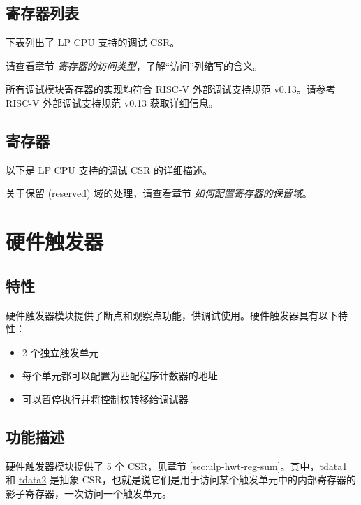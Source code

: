 \documentclass[main\_\_CN.tex]{subfiles}
\begin{document}
\subsection{寄存器列表}

下表列出了 LP CPU 支持的调试 CSR。

请查看章节 \hyperref[glossary-access-types]{\textit{寄存器的访问类型}}，了解“访问”列缩写的含义。



所有调试模块寄存器的实现均符合 RISC-V 外部调试支持规范 v0.13。请参考 RISC-V 外部调试支持规范 v0.13 获取详细信息。

\subsection{寄存器}
以下是 LP CPU 支持的调试 CSR 的详细描述。

关于保留 (reserved) 域的处理，请查看章节 \hyperref[programming-reserved-field]{\textit{如何配置寄存器的保留域}}。




\section{硬件触发器}\label{sec:ulp-trigger}

\subsection{特性}
硬件触发器模块提供了断点和观察点功能，供调试使用。硬件触发器具有以下特性：

\begin{itemize}
    \item 2 个独立触发单元
    \item 每个单元都可以配置为匹配程序计数器的地址
    \item 可以暂停执行并将控制权转移给调试器

\end{itemize}

\subsection{功能描述}
\label{sec:ulp-hwt-func-descr}


硬件触发器模块提供了 5 个 CSR，见章节 \ref{sec:ulp-hwt-reg-sum}。其中，\hyperref[regdesc:LPTDATA1]{tdata1} 和 \hyperref[regdesc:LPTDATA2]{tdata2} 是抽象 CSR，也就是说它们是用于访问某个触发单元中的内部寄存器的影子寄存器，一次访问一个触发单元。
\end{document}
